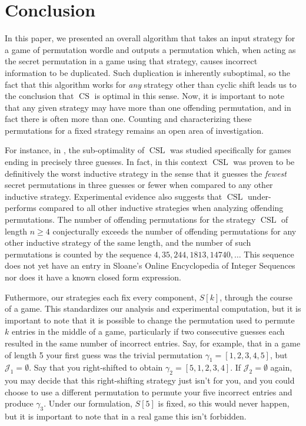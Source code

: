 \documentclass[article]{amsart}
\theoremstyle{plain}
\DeclareMathOperator{\CS}{CS}
\DeclareMathOperator{\CSL}{CSL}
\begin{document}
\section{Conclusion} \label{sec:conc}

In this paper, we presented an overall algorithm that takes an input strategy for a game of permutation wordle and outputs a permutation which, when acting as the secret permutation in a game using that strategy, causes incorrect information to be duplicated. Such duplication is inherently suboptimal, so the fact that this algorithm works for \textit{any} strategy other than cyclic shift leads us to the conclusion that $\CS$ is optimal in this sense. Now, it is important to note that any given strategy may have more than one offending permutation, and in fact there is often more than one. Counting and characterizing these permutations for a fixed strategy remains an open area of investigation.

For instance, in \cite{hiveley2025}, the sub-optimality of $\CSL$ was studied specifically for games ending in precisely three guesses. In fact, in this context $\CSL$ was proven to be definitively the worst inductive strategy in the sense that it guesses the \textit{fewest} secret permutations in three guesses or fewer when compared to any other inductive strategy. Experimental evidence also suggests that $\CSL$ under-performs compared to all other inductive strategies when analyzing offending permutations. The number of offending permutations for the strategy $\CSL$ of length $n \geq 4$ conjecturally exceeds the number of offending permutations for any other inductive strategy of the same length, and the number of such permutations is counted by the sequence $4, 35, 244, 1813, 14740, \dots $ This sequence does not yet have an entry in Sloane's Online Encyclopedia of Integer Sequences nor does it have a known closed form expression. %

Futhermore, our strategies each fix every component, $S[k]$, through the course of a game. This standardizes our analysis and experimental computation, but it is important to note that it is possible to change the permutation used to permute $k$ entries in the middle of a game, particularly if two consecutive guesses each resulted in the same number of incorrect entries. Say, for example, that in a game of length 5 your first guess was the trivial permutation $\gamma_1 = [1,2,3,4,5]$, but $\mathcal{J}_1 = \emptyset$. Say that you right-shifted to obtain $\gamma_2 = [5,1,2,3,4]$. If $\mathcal{J}_2 = \emptyset$ again, you may decide that this right-shifting strategy just isn't for you, and you could choose to use a different permutation to permute your five incorrect entries and produce $\gamma_3$. Under our formulation, $S[5]$ is fixed, so this would never happen, but it is important to note that in a real game this isn't forbidden. 
\end{document}
